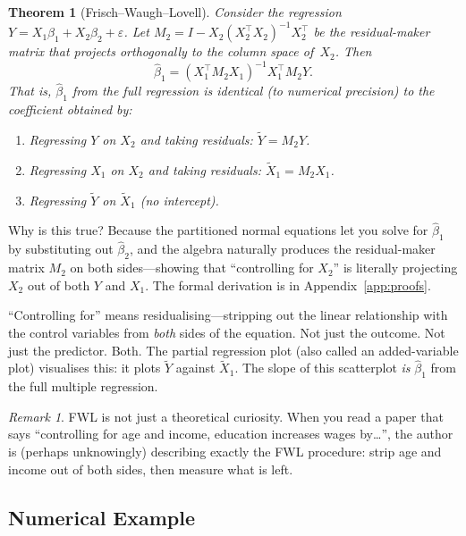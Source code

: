 \documentclass[11pt,a4paper]{article}
\theoremstyle{definition}
\theoremstyle{plain}
\newtheorem{theorem}{Theorem}[section]
\theoremstyle{remark}
\newtheorem{remark}{Remark}[section]
\newcommand{\bhat}{\hat{\beta}}
\begin{document}
\begin{theorem}[Frisch--Waugh--Lovell]\label{thm:fwl}
Consider the regression $Y = X_1 \beta_1 + X_2 \beta_2 + \varepsilon$.
Let $M_2 = I - X_2(X_2^\top X_2)^{-1}X_2^\top$ be the residual-maker matrix that projects orthogonally to the column space of~$X_2$.
Then
\begin{equation}\label{eq:fwl}
  \bhat_1 = (X_1^\top M_2 X_1)^{-1} X_1^\top M_2 Y.
\end{equation}
That is, $\bhat_1$ from the full regression is \emph{identical} (to numerical precision) to the coefficient obtained by:
\begin{enumerate}[nosep]
  \item Regressing $Y$ on $X_2$ and taking residuals: $\tilde{Y} = M_2 Y$.
  \item Regressing $X_1$ on $X_2$ and taking residuals: $\tilde{X}_1 = M_2 X_1$.
  \item Regressing $\tilde{Y}$ on $\tilde{X}_1$ (no intercept).
\end{enumerate}
\end{theorem}

Why is this true? Because the partitioned normal equations let you solve for $\bhat_1$ by substituting out $\bhat_2$, and the algebra naturally produces the residual-maker matrix $M_2$ on both sides---showing that ``controlling for $X_2$'' is literally projecting $X_2$ out of both $Y$ and $X_1$. The formal derivation is in Appendix~\ref{app:proofs}.

\begin{keyinsight}
``Controlling for'' means residualising---stripping out the linear relationship with the control variables from \emph{both} sides of the equation. Not just the outcome. Not just the predictor. Both.
The partial regression plot (also called an added-variable plot) visualises this: it plots $\tilde{Y}$ against $\tilde{X}_1$.
The slope of this scatterplot \emph{is} $\bhat_1$ from the full multiple regression.
\end{keyinsight}

\begin{remark}
FWL is not just a theoretical curiosity. When you read a paper that says ``controlling for age and income, education increases wages by\ldots'', the author is (perhaps unknowingly) describing exactly the FWL procedure: strip age and income out of both sides, then measure what is left.
\end{remark}

\subsection{Numerical Example}
\end{document}
